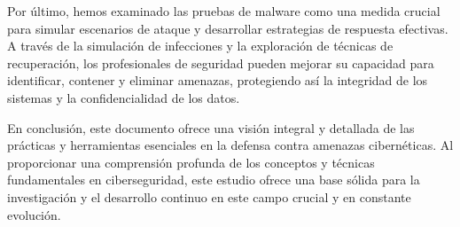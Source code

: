 \documentclass[stu, 11pt, letterpaper, donotrepeattitle, floatsintext, natbib]{apa7}
\begin{document}
Por último, hemos examinado las pruebas de malware como una medida crucial para simular escenarios de ataque y desarrollar estrategias de respuesta efectivas. A través de la simulación de infecciones y la exploración de técnicas de recuperación, los profesionales de seguridad pueden mejorar su capacidad para identificar, contener y eliminar amenazas, protegiendo así la integridad de los sistemas y la confidencialidad de los datos.

En conclusión, este documento ofrece una visión integral y detallada de las prácticas y herramientas esenciales en la defensa contra amenazas cibernéticas. Al proporcionar una comprensión profunda de los conceptos y técnicas fundamentales en ciberseguridad, este estudio ofrece una base sólida para la investigación y el desarrollo continuo en este campo crucial y en constante evolución.

\newpage
\renewcommand\refname{\large\textbf{Referencias}}

\end{document}
